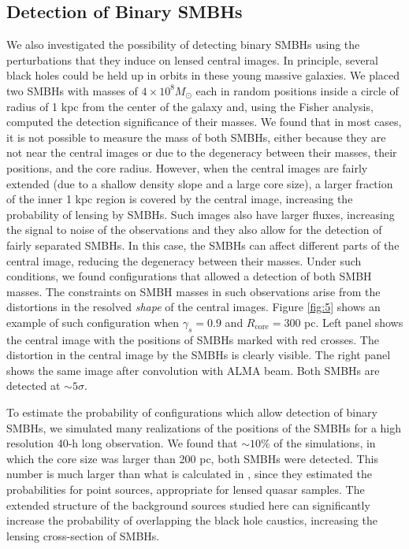 \documentclass[chicago]{emulateapj}
\begin{document}
\subsection{Detection of Binary SMBHs}
We also investigated the possibility of detecting binary SMBHs using the perturbations that they induce on lensed central images. 
In principle, several black holes could be held up in orbits in these young massive galaxies.
We placed two SMBHs with masses of $4\times10^8 M_{\odot}$ each in random positions inside a circle of radius of 1 kpc from the center of the galaxy and, using the Fisher analysis, computed the detection significance of their masses. 
We found that in most cases, it is not possible to measure the mass of both SMBHs, either because they are not near the central images or due to the degeneracy between their masses, their positions, and the core radius. 
However, when the central images are fairly extended (due to a shallow density slope and a large core size), a larger fraction of the inner 1 kpc region is covered by the central image, increasing the probability of lensing by SMBHs. Such images also have larger fluxes, increasing the signal to noise of the observations and they also allow for the detection of fairly separated SMBHs. In this case, the SMBHs can affect different parts of the central image, reducing the degeneracy between their masses.
Under such conditions, we found configurations that allowed a detection of both SMBH masses. The constraints on SMBH masses in such observations arise from the distortions in the resolved \emph{shape} of the central images. Figure \ref{fig:5} shows an example of such configuration when $\gamma_s = 0.9$ and $R_{\mathrm{core}}=300$ pc. Left panel shows the central image with the positions of SMBHs marked with red crosses. The distortion in the central image by the SMBHs is clearly visible. The right panel shows the same image after convolution with ALMA beam. Both SMBHs are detected at $\sim5\sigma$.


To estimate the probability of configurations which allow detection of binary SMBHs, we simulated many realizations of the positions of the SMBHs for a high resolution 40-h long observation. 
We found that $\sim10\%$ of the simulations, in which the core size was larger than 200 pc, both SMBHs were detected. 
This number is much larger than what is calculated in \citet{Li:12}, since they estimated  the probabilities for point sources, appropriate for lensed quasar samples. The extended structure of the background sources studied here can significantly increase the probability of overlapping the black hole caustics, increasing the lensing cross-section of SMBHs.
\end{document}
